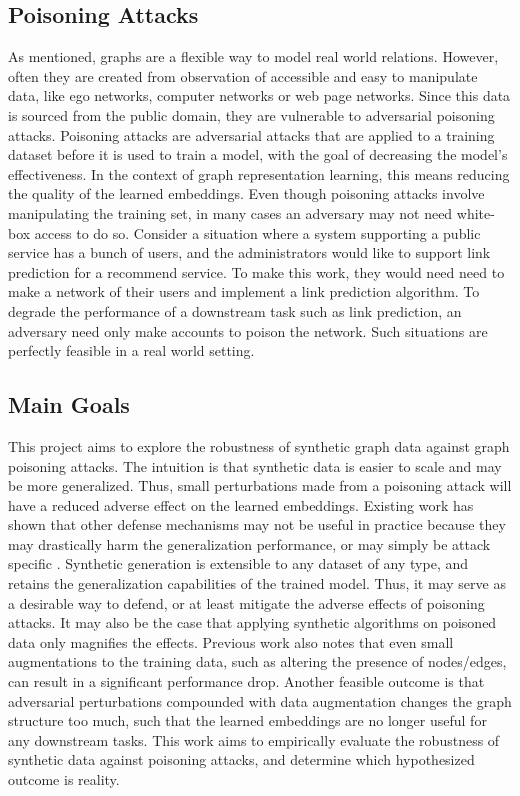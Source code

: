 \documentclass{article}
\begin{document}
\subsection{Poisoning Attacks}

As mentioned, graphs are a flexible way to model real world relations. However, often they are created from observation of accessible and easy to manipulate data, like ego networks, computer networks or web page networks. Since this data is sourced from the public domain, they are vulnerable to adversarial poisoning attacks. Poisoning attacks are adversarial attacks that are applied to a training dataset before it is used to train a model, with the goal of decreasing the model's effectiveness. In the context of graph representation learning, this means reducing the quality of the learned embeddings. Even though poisoning attacks involve manipulating the training set, in many cases an adversary may not need white-box access to do so. Consider a situation where a system supporting a public service has a bunch of users, and the administrators would like to support link prediction for a recommend service. To make this work, they would need need to make a network of their users and implement a link prediction algorithm. To degrade the performance of a downstream task such as link prediction, an adversary need only make accounts to poison the network. Such situations are perfectly feasible in a real world setting. 

\subsection{Main Goals}

This project aims to explore the robustness of synthetic graph data against graph poisoning attacks. The intuition is that synthetic data is easier to scale and may be more generalized. Thus, small perturbations made from a poisoning attack will have a reduced adverse effect on the learned embeddings. Existing work has shown that other defense mechanisms may not be useful in practice because they may drastically harm the generalization performance, or may simply be attack specific \cite{liu2023friendly}. Synthetic generation is extensible to any dataset of any type, and retains the generalization capabilities of the trained model. Thus, it may serve as a desirable way to defend, or at least mitigate the adverse effects of poisoning attacks. It may also be the case that applying synthetic algorithms on poisoned data only magnifies the effects. Previous work also notes that even small augmentations to the training data, such as altering the presence of nodes/edges, can result in a significant performance drop. Another feasible outcome is that adversarial perturbations compounded with data augmentation changes the graph structure too much, such that the learned embeddings are no longer useful for any downstream tasks. This work aims to empirically evaluate the robustness of synthetic data against poisoning attacks, and determine which hypothesized outcome is reality. 
\end{document}
